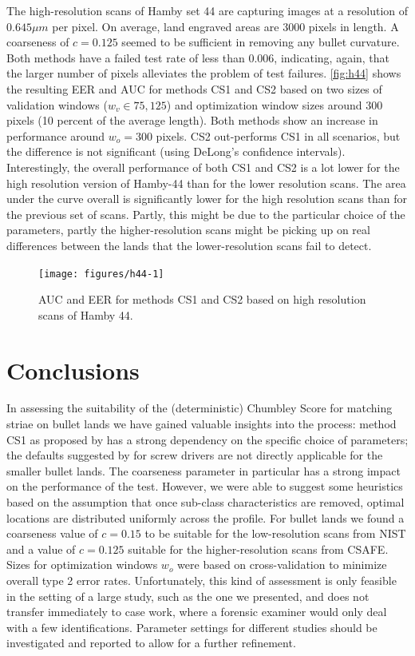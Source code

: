 \documentclass[12pt]{article}
\begin{document}
The high-resolution scans of Hamby set 44 are capturing images at a
resolution of \(0.645 \mu m\) per pixel. On average, land engraved areas
are 3000 pixels in length. A coarseness of \(c = 0.125\) seemed to be
sufficient in removing any bullet curvature. Both methods have a failed
test rate of less than 0.006, indicating, again, that the larger number
of pixels alleviates the problem of test failures. \autoref{fig:h44}
shows the resulting EER and AUC for methods CS1 and CS2 based on two
sizes of validation windows (\(w_v \in 75, 125\)) and optimization
window sizes around 300 pixels (10 percent of the average length). Both
methods show an increase in performance around \(w_o = 300\) pixels. CS2
out-performs CS1 in all scenarios, but the difference is not significant
(using DeLong's confidence intervals). Interestingly, the overall
performance of both CS1 and CS2 is a lot lower for the high resolution
version of Hamby-44 than for the lower resolution scans. The area under
the curve overall is significantly lower for the high resolution scans
than for the previous set of scans. Partly, this might be due to the
particular choice of the parameters, partly the higher-resolution scans
might be picking up on real differences between the lands that the
lower-resolution scans fail to detect.

\begin{figure}

{\centering \texttt{[image: figures/h44-1]} 

}

\caption{AUC and EER for methods CS1 and CS2 based on high resolution scans of Hamby 44. }\label{fig:h44}
\end{figure}

\hypertarget{conclusions}{%
\section{Conclusions}\label{conclusions}}

In assessing the suitability of the (deterministic) Chumbley Score for
matching striae on bullet lands we have gained valuable insights into
the process: method CS1 as proposed by \citet{hadler} has a strong
dependency on the specific choice of parameters; the defaults suggested
by \citet{hadler} for screw drivers are not directly applicable for the
smaller bullet lands. The coarseness parameter in particular has a
strong impact on the performance of the test. However, we were able to
suggest some heuristics based on the assumption that once sub-class
characteristics are removed, optimal locations are distributed uniformly
across the profile. For bullet lands we found a coarseness value of
\(c = 0.15\) to be suitable for the low-resolution scans from NIST and a
value of \(c=0.125\) suitable for the higher-resolution scans from
CSAFE. Sizes for optimization windows \(w_o\) were based on
cross-validation to minimize overall type 2 error rates. Unfortunately,
this kind of assessment is only feasible in the setting of a large
study, such as the one we presented, and does not transfer immediately
to case work, where a forensic examiner would only deal with a few
identifications. Parameter settings for different studies should be
investigated and reported to allow for a further refinement.
\end{document}

